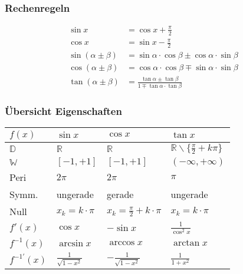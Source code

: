 \subsubsection{Rechenregeln}
\begin{align*}
	\sin{x}& = \cos{x} + \frac{\pi}{2}\\
	\cos{x}& = \sin{x} - \frac{\pi}{2}\\
\sin(\alpha \pm \beta)& = \sin{\alpha} \cdot \cos{\beta} \pm \cos{\alpha} \cdot \sin{\beta} \\ 
\cos(\alpha \pm \beta)& = \cos{\alpha} \cdot \cos{\beta} \mp \sin{\alpha} \cdot \sin{\beta} \\
\tan(\alpha \pm \beta)& = \frac{\tan{\alpha} \pm \tan{\beta}}{1 \mp \tan{\alpha} \cdot \tan{\beta}}
\end{align*}

\subsubsection{Übersicht Eigenschaften}
\begin{tabular}{@{}p{\the\MyLenA}%
				@{}p{}%
				@{}p{}%
				@{}p{}}
	\textbf{$f(x)$}	& \textbf{$\sin x$} 					& \textbf{$\cos x$} 					& \textbf{$\tan x$}\\\hline
	$\mathbb{D}$ 	& $\mathbb{R}$ 							& $\mathbb{R}$ 							& $\mathbb{R} \backslash \{\frac{\pi}{2} + k\pi\}$\\
	$\mathbb{W}$	& $[-1, +1]$							& $[-1, +1]$							& $(-\infty, +\infty)$\\
	Peri			& $2\pi$								& $2\pi$								& $\pi$\\	
	Symm.			& ungerade								& gerade								& ungerade \\
	Null			& $x_k = k \cdot \pi$ 					& $x_k = \frac{\pi}{2} + k \cdot \pi$	& $x_k = k \cdot \pi$\\
	$f'(x)$			& $\cos x$								& $-\sin x$								& $\frac{1}{\cos^2 x}$\\
	$f^{-1}(x)$		& $\arcsin x$							& $\arccos x$							& $\arctan x$\\
	$f^{-1'}(x)$	& $\frac{1}{\sqrt{1-x^2}}$				& $-\frac{1}{\sqrt{1-x^2}}$				& $\frac{1}{1+x^2}$
\end{tabular}



